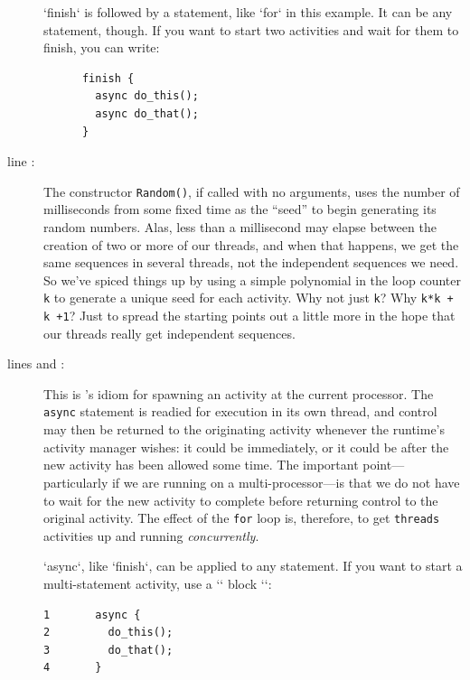 \begin{description}
\xcd`finish` is followed by a statement, like \xcd`for` in this example.  It
can be any statement, though.  If you want to start two activities and wait
for them to finish, you can write: 

\begin{verbatim}
      finish {
        async do_this();
        async do_that();
      }
\end{verbatim}


\item[line \xlref{mpia-r}{8}:]  The constructor {\tt Random()}, if called with no arguments,
uses the number of milliseconds from some fixed time as the ``seed'' to begin
generating its random numbers. Alas, less than a millisecond may elapse between
the creation of two or more of our threads, and when that happens, we get the
same sequences in several threads, not the independent sequences we need.
So we've spiced things up by using a simple
polynomial in the loop counter {\tt k} to generate a unique seed for each activity.
Why not just {\tt k}? Why {\tt k*k + k +1}?  Just to spread the starting points out
a little more in the hope that our threads really
get independent sequences.

\item[lines \xlref{mpia-kval}{10} and \xlref{mpia-async}{11}:]
This is \Xten's idiom for spawning an activity
at the current processor.
The {\tt async} statement is readied for execution in its own thread, and control
may then be returned to the originating activity whenever the \Xten{} runtime's
activity manager wishes: it could be immediately, or it could be after the new
activity has been allowed some time. The important point---particularly if we
are running on a multi-processor---is that we do not have
to wait for the new activity to complete before returning control to the
original activity.  The effect of the {\tt for} loop is, therefore, to get
{\tt threads} activities up and running {\em concurrently}.

\xcd`async`, like \xcd`finish`, can be applied to any statement.  If you want
to start a multi-statement activity, use a \xcd`{` block \xcd`}`: 

\begin{verbatim}
1       async {
2         do_this();
3         do_that();
4       }    
\end{verbatim}



\end{description}
